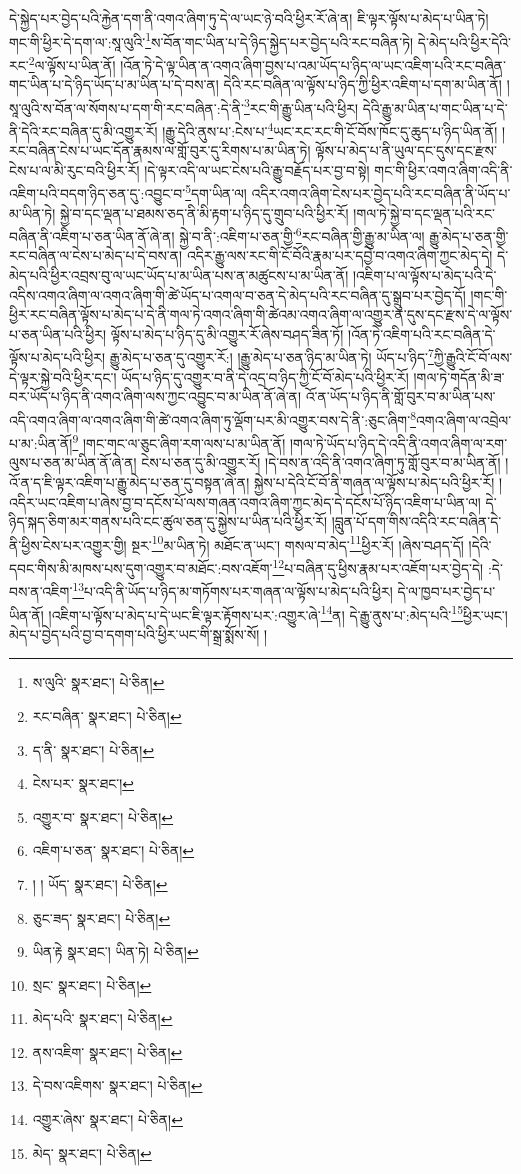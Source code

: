 དེ་སྐྱེད་པར་བྱེད་པའི་རྐྱེན་དག་ནི་འགའ་ཞིག་ཏུ་དེ་ལ་ཡང་ཉེ་བའི་ཕྱིར་རོ་ཞེ་ན། ཇི་ལྟར་ལྟོས་པ་མེད་པ་ཡིན་ཏེ། གང་གི་ཕྱིར་དེ་དག་ལ་:སཱ་ལུའི་\footnote{ས་ལུའི་  སྣར་ཐང་།  པེ་ཅིན། }ས་བོན་གང་ཡིན་པ་དེ་ཉིད་སྐྱེད་པར་བྱེད་པའི་རང་བཞིན་ཏེ། དེ་མེད་པའི་ཕྱིར་དེའི་རང་\footnote{རང་བཞིན་  སྣར་ཐང་།  པེ་ཅིན། }ལ་ལྟོས་པ་ཡིན་ནོ། །འོན་ཏེ་དེ་ལྟ་ཡིན་ན་འགའ་ཞིག་བྱས་པ་འམ་ཡོད་པ་ཉིད་ལ་ཡང་འཇིག་པའི་རང་བཞིན་གང་ཡིན་པ་དེ་ཉིད་ཡོད་པ་མ་ཡིན་པ་དེ་བས་ན། དེའི་རང་བཞིན་ལ་ལྟོས་པ་ཉིད་ཀྱི་ཕྱིར་འཇིག་པ་དག་མ་ཡིན་ནོ། །སཱ་ལུའི་ས་བོན་ལ་སོགས་པ་དག་གི་རང་བཞིན་:དེ་ནི་\footnote{ད་ནི་  སྣར་ཐང་།  པེ་ཅིན། }རང་གི་རྒྱུ་ཡིན་པའི་ཕྱིར། དེའི་རྒྱུ་མ་ཡིན་པ་གང་ཡིན་པ་དེ་ནི་དེའི་རང་བཞིན་དུ་མི་འགྱུར་རོ། །རྒྱུ་དེའི་ནུས་པ་:ངེས་པ་\footnote{ངེས་པར་  སྣར་ཐང་། }ཡང་རང་རང་གི་ངོ་བོས་ཁོང་དུ་ཆུད་པ་ཉིད་ཡིན་ནོ། །རང་བཞིན་ངེས་པ་ཡང་དོན་རྣམས་ལ་གློ་བུར་དུ་རིགས་པ་མ་ཡིན་ཏེ། ལྟོས་པ་མེད་པ་ནི་ཡུལ་དང་དུས་དང་རྫས་ངེས་པ་ལ་མི་རུང་བའི་ཕྱིར་རོ། །དེ་ལྟར་འདི་ལ་ཡང་ངེས་པའི་རྒྱུ་བརྗོད་པར་བྱ་བ་སྟེ། གང་གི་ཕྱིར་འགའ་ཞིག་འདི་ནི་འཇིག་པའི་བདག་ཉིད་ཅན་དུ་:འབྱུང་བ་\footnote{འགྱུར་བ་  སྣར་ཐང་།  པེ་ཅིན། }དག་ཡིན་ལ། འདིར་འགའ་ཞིག་ངེས་པར་བྱེད་པའི་རང་བཞིན་ནི་ཡོད་པ་མ་ཡིན་ཏེ། སྐྱེ་བ་དང་ལྡན་པ་ཐམས་ཅད་ནི་མི་རྟག་པ་ཉིད་དུ་གྲུབ་པའི་ཕྱིར་རོ། །གལ་ཏེ་སྐྱེ་བ་དང་ལྡན་པའི་རང་བཞིན་ནི་འཇིག་པ་ཅན་ཡིན་ནོ་ཞེ་ན། སྐྱེ་བ་ནི་:འཇིག་པ་ཅན་གྱི་\footnote{འཇིག་པ་ཅན་  སྣར་ཐང་།  པེ་ཅིན། }རང་བཞིན་གྱི་རྒྱུ་མ་ཡིན་ལ། རྒྱུ་མེད་པ་ཅན་གྱི་རང་བཞིན་ལ་ངེས་པ་མེད་པ་དེ་བས་ན། འདིར་རྒྱུ་ལས་རང་གི་ངོ་བོའི་རྣམ་པར་དབྱེ་བ་འགའ་ཞིག་ཀྱང་མེད་དེ། དེ་མེད་པའི་ཕྱིར་འབྲས་བུ་ལ་ཡང་ཡོད་པ་མ་ཡིན་པས་ན་མཚུངས་པ་མ་ཡིན་ནོ། །འཇིག་པ་ལ་ལྟོས་པ་མེད་པའི་དེ་འདིས་འགའ་ཞིག་ལ་འགའ་ཞིག་གི་ཚེ་ཡོད་པ་འགལ་བ་ཅན་དེ་མེད་པའི་རང་བཞིན་དུ་སྒྲུབ་པར་བྱེད་དོ། །གང་གི་ཕྱིར་རང་བཞིན་ལྟོས་པ་མེད་པ་དེ་ནི་གལ་ཏེ་འགའ་ཞིག་གི་ཚེའམ་འགའ་ཞིག་ལ་འགྱུར་ན་དུས་དང་རྫས་དེ་ལ་ལྟོས་པ་ཅན་ཡིན་པའི་ཕྱིར། ལྟོས་པ་མེད་པ་ཉིད་དུ་མི་འགྱུར་རོ་ཞེས་བཤད་ཟིན་ཏོ། །འོན་ཏེ་འཇིག་པའི་རང་བཞིན་དེ་ལྟོས་པ་མེད་པའི་ཕྱིར། རྒྱུ་མེད་པ་ཅན་དུ་འགྱུར་རོ:། །རྒྱུ་མེད་པ་ཅན་ཉིད་མ་ཡིན་ཏེ། ཡོད་པ་ཉིད་\footnote{། ། ཡོད་  སྣར་ཐང་།  པེ་ཅིན། }ཀྱི་རྒྱུའི་ངོ་བོ་ལས་དེ་ལྟར་སྐྱེ་བའི་ཕྱིར་དང་། ཡོད་པ་ཉིད་དུ་འགྱུར་བ་ནི་དེ་འདྲ་བ་ཉིད་ཀྱི་ངོ་བོ་མེད་པའི་ཕྱིར་རོ། །གལ་ཏེ་གདོན་མི་ཟ་བར་ཡོད་པ་ཉིད་ནི་འགའ་ཞིག་ལས་ཀྱང་འབྱུང་བ་མ་ཡིན་ནོ་ཞེ་ན། འོ་ན་ཡོད་པ་ཉིད་ནི་གློ་བུར་བ་མ་ཡིན་པས་འདི་འགའ་ཞིག་ལ་འགའ་ཞིག་གི་ཚེ་འགའ་ཞིག་ཏུ་ལྡོག་པར་མི་འགྱུར་བས་དེ་ནི་:ཅུང་ཞིག་\footnote{ཅུང་ཟད་  སྣར་ཐང་།  པེ་ཅིན། }འགའ་ཞིག་ལ་འབྲེལ་པ་མ་:ཡིན་ནོ།\footnote{ཡིན་རྟེ  སྣར་ཐང་། ཡིན་ཏེ།  པེ་ཅིན། } །གང་གང་ལ་ཅུང་ཞིག་རག་ལས་པ་མ་ཡིན་ནོ། །གལ་ཏེ་ཡོད་པ་ཉིད་དེ་འདི་ནི་འགའ་ཞིག་ལ་རག་ལུས་པ་ཅན་མ་ཡིན་ནོ་ཞེ་ན། ངེས་པ་ཅན་དུ་མི་འགྱུར་རོ། །དེ་བས་ན་འདི་ནི་འགའ་ཞིག་ཏུ་གློ་བུར་བ་མ་ཡིན་ནོ། །འོ་ན་ད་ཇི་ལྟར་འཇིག་པ་རྒྱུ་མེད་པ་ཅན་དུ་བསྟན་ཞེ་ན། སྐྱེས་པ་དེའི་ངོ་བོ་ནི་གཞན་ལ་ལྟོས་པ་མེད་པའི་ཕྱིར་རོ། །འདིར་ཡང་འཇིག་པ་ཞེས་བྱ་བ་དངོས་པོ་ལས་གཞན་འགའ་ཞིག་ཀྱང་མེད་དེ་དངོས་པོ་ཉིད་འཇིག་པ་ཡིན་ལ། དེ་ཉིད་སྐད་ཅིག་མར་གནས་པའི་ངང་ཚུལ་ཅན་དུ་སྐྱེས་པ་ཡིན་པའི་ཕྱིར་རོ། །བླུན་པོ་དག་གིས་འདིའི་རང་བཞིན་དེ་ནི་ཕྱིས་ངེས་པར་འགྱུར་གྱི། སྔར་\footnote{སྲང་  སྣར་ཐང་།  པེ་ཅིན། }མ་ཡིན་ཏེ། མཐོང་ན་ཡང་། གསལ་བ་མེད་\footnote{མེད་པའི་  སྣར་ཐང་།  པེ་ཅིན། }ཕྱིར་རོ། །ཞེས་བཤད་དོ། །དེའི་དབང་གིས་མི་མཁས་པས་དུག་འགྱུར་བ་མཐོང་:བས་འཇོག་\footnote{ནས་འཇིག་  སྣར་ཐང་།  པེ་ཅིན། }པ་བཞིན་དུ་ཕྱིས་རྣམ་པར་འཇོག་པར་བྱེད་དེ། :དེ་བས་ན་འཇིག་\footnote{དེ་བས་འཇིགས་  སྣར་ཐང་།  པེ་ཅིན། }པ་འདི་ནི་ཡོད་པ་ཉིད་མ་གཏོགས་པར་གཞན་ལ་ལྟོས་པ་མེད་པའི་ཕྱིར། དེ་ལ་ཁྱབ་པར་བྱེད་པ་ཡིན་ནོ། །འཇིག་པ་ལྟོས་པ་མེད་པ་དེ་ཡང་ཇི་ལྟར་རྟོགས་པར་:འགྱུར་ཞེ་\footnote{འགྱུར་ཞེས་  སྣར་ཐང་།  པེ་ཅིན། }ན། དེ་རྒྱུ་ནུས་པ་:མེད་པའི་\footnote{མེད་  སྣར་ཐང་།  པེ་ཅིན། }ཕྱིར་ཡང་། མེད་པ་བྱེད་པའི་བྱ་བ་དགག་པའི་ཕྱིར་ཡང་གི་སྒྲ་སྨོས་སོ། །
